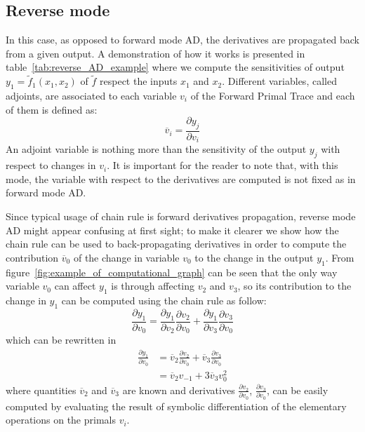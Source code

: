 
\subsection{Reverse mode}
\label{subsec:reverse_mode_AD}

In this case, as opposed to forward mode AD, the derivatives are propagated back from a given output. A demonstration of how it works is presented in table~\ref{tab:reverse_AD_example} where we compute the sensitivities of output $y_1 = \tilde{f}_1(x_1, x_2)$ of $\tilde{f}$ respect the inputs $x_1$ and $x_2$. Different variables, called adjoints, are associated to each variable $v_i$ of the Forward Primal Trace and each of them is defined as:
\[
\overline{v}_i = \frac{\partial y_j}{\partial v_i}
\]
An adjoint variable is nothing more than the sensitivity of the output $y_j$ with respect to changes in $v_i$. It is important for the reader to note that, with this mode, the variable with respect to the derivatives are computed is not fixed as in forward mode AD.

Since typical usage of chain rule is forward derivatives propagation, reverse mode AD might appear confusing at first sight; to make it clearer we show how the chain rule can be used to back-propagating derivatives in order to compute the contribution $\overline{v}_0$ of the change in variable $v_0$ to the change in the output $y_1$. From figure~\ref{fig:example_of_computational_graph} can be seen that the only way variable $v_0$ can affect $y_1$ is through affecting $v_2$ and $v_3$, so its contribution to the change in $y_1$ can be computed using the chain rule as follow:
\begin{equation}
	\frac{\partial y_1}{\partial v_0} = \frac{\partial y_1}{\partial v_2} \frac{\partial v_2}{\partial v_0} + \frac{\partial y_1}{\partial v_3} \frac{\partial v_3}{\partial v_0}
\end{equation}
which can be rewritten in
\begin{equation}
	\begin{split}
		\frac{\partial y_1}{\partial v_0} & = \overline{v}_2 \frac{\partial v_2}{\partial v_0} + \overline{v}_3 \frac{\partial v_3}{\partial v_0}  \\[2ex]
										  & = \overline{v}_2 v_{-1} + 3 \overline{v}_3 v_0^2
	\end{split}
\end{equation}
where quantities $\overline{v}_2$ and $\overline{v}_3$ are known and derivatives $\frac{\partial v_2}{\partial v_0}$, $\frac{\partial v_3}{\partial v_0}$, can be easily computed by evaluating the result of symbolic differentiation of the elementary operations on the primals $v_i$.

